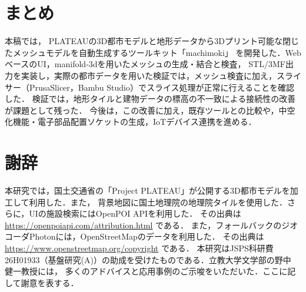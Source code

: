 \documentclass[twoside]{wiss}
\begin{document}
\section{まとめ}
本稿では，
PLATEAUの3D都市モデルと地形データから3Dプリント可能な閉じたメッシュモデルを自動生成するツールキット「machimoki」
を開発した．WebベースのUI，manifold-3dを用いたメッシュの生成・結合と検査，
STL/3MF出力を実装し，実際の都市データを用いた検証では，メッシュ検査に加え，スライサー（PrusaSlicer，Bambu Studio）でスライス処理が正常に行えることを確認した．
検証では，地形タイルと建物データの標高の不一致による接続性の改善が課題として残った．
今後は，この改善に加え，既存ツールとの比較や，中空化機能・電子部品配置ソケットの生成，IoTデバイス連携を進める．
\label{bodyend}

\section*{謝辞}
本研究では，国土交通省の「Project PLATEAU」が公開する3D都市モデルを加工して利用した．また，
背景地図に国土地理院の地理院タイルを使用した．さらに，UIの施設検索にはOpenPOI APIを利用した．
その出典は \url{https://openpoiapi.com/}\allowbreak\url{attribution.html} である．
また，フォールバックのジオコーダPhotonには，OpenStreetMapのデータを利用した．
その出典は \url{https://www.openstreetmap.org/}\allowbreak\url{copyright} である．
本研究はJSPS科研費26H01933（基盤研究(A)）の助成を受けたものである．立教大学文学部の野中 健一教授には，
多くのアドバイスと応用事例のご示唆をいただいた．ここに記して謝意を表する．

{\small


}
\end{document}
